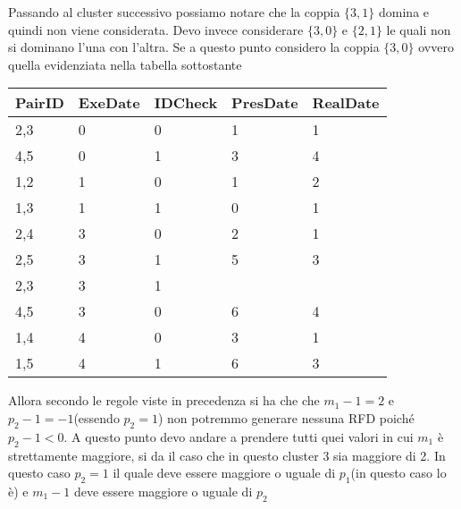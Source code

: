 Passando al cluster successivo possiamo notare che la coppia $\{3,1\}$ domina e quindi non viene considerata.
Devo invece considerare $\{3,0\}$ e $\{2,1\}$ le quali non si dominano l'una con l'altra.
Se a questo punto considero la coppia $\{3,0\}$ ovvero quella evidenziata nella tabella sottostante
\begin{table}[H]
	\centering
	\begin{tabu}{l l | l!{\color{red}\vrule} l l!{\color{red}\vrule}}
		PairID & ExeDate & IDCheck & PresDate & RealDate \\
		,3 & 0 & 0 & 1 & 1\\
		\rowfont{\color{gray}}
		4,5 & 0 & 1 & 3 & 4 \\
		,2 & 1 & 0 & 1 & 2\\
		1,3 & 1 & 1 & 0 & 1\\
		,4 & 3 & 0 & 2 & 1\\
		\rowfont{\color{gray}}
		2,5 & 3 & 1 & 5 & 3 \\
		2,3 & 3 & 1 &  & \\
		\rowfont{\color{gray}}
		4,5 & 3 & 0 & 6 & 4 \\
		,4 & 4 & 0 & 3 & 1\\
		\rowfont{\color{gray}}
		1,5 & 4 & 1 & 6 & 3 \\	
	\end{tabu}
\end{table}
Allora secondo le regole viste in precedenza si ha che  che $m_{1} - 1 = 2$ e $p_{2} - 1 = - 1$(essendo $p_{2} = 1$) non potremmo generare nessuna RFD poiché $p_{2} - 1 < 0$. A questo punto devo andare a prendere tutti quei valori in cui $m_{1}$ è strettamente maggiore, si da il caso che in questo cluster 3 sia maggiore di 2. In questo caso $p_{2}=1$ il quale deve essere maggiore o uguale di $p_{1}$(in questo caso lo è) e $m_{1} - 1$ deve essere maggiore o uguale di $p_{2}$

